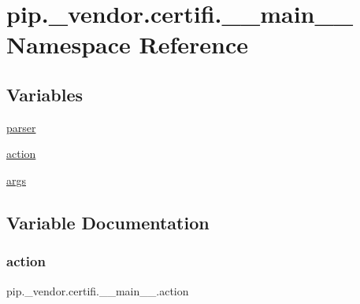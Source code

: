 \hypertarget{namespacepip_1_1__vendor_1_1certifi_1_1____main____}{}\section{pip.\+\_\+vendor.\+certifi.\+\_\+\+\_\+main\+\_\+\+\_\+ Namespace Reference}
\label{namespacepip_1_1__vendor_1_1certifi_1_1____main____}
\subsection*{Variables}
\begin{DoxyCompactItemize}
\item 
\hyperlink{namespacepip_1_1__vendor_1_1certifi_1_1____main_____a309ef6e4e02e6b6699611b1ee73aed16}{parser}
\item 
\hyperlink{namespacepip_1_1__vendor_1_1certifi_1_1____main_____a4b0ad2e00d5fbbfe1537451e513d91c1}{action}
\item 
\hyperlink{namespacepip_1_1__vendor_1_1certifi_1_1____main_____a35b989886b85ec2f8fd170a8dab1a2e5}{args}
\end{DoxyCompactItemize}


\subsection{Variable Documentation}
\mbox{\label{namespacepip_1_1__vendor_1_1certifi_1_1____main_____a4b0ad2e00d5fbbfe1537451e513d91c1}} 
\subsubsection{\texorpdfstring{action}{action}}
{\footnotesize\ttfamily pip.\+\_\+vendor.\+certifi.\+\_\+\+\_\+main\+\_\+\+\_\+.\+action}

\mbox{\label{namespacepip_1_1__vendor_1_1certifi_1_1____main_____a35b989886b85ec2f8fd170a8dab1a2e5}} 
